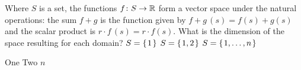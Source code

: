 
\begin{Exercise}[
name={},
title={}, 
difficulty=0,
origin={\cite{JH}}]
Where \( S \) is a set, the functions
\( \mbox{$f\colon S\to \mathbb{R}$} \) form a vector space under the natural operations:
the sum $f+g$ is the function given by 
\( f+g\,(s)=f(s)+g(s) \) and the scalar product is
\( r\cdot f \, (s)=r\cdot f(s) \).
What is the dimension of the space resulting for each domain?
\Question \( S=\mbox{$\left\{\hspace{0.1em}1\hspace{0.1em}\right\}$} \)
\Question \( S=\mbox{$\left\{\hspace{0.1em}1,2\hspace{0.1em}\right\}$} \)
\Question \( S=\mbox{$\left\{\hspace{0.1em}1,\ldots,n\hspace{0.1em}\right\}$} \)
\end{Exercise}

\begin{Answer}
\Question One
\Question Two
\Question \( n \)
\end{Answer}
